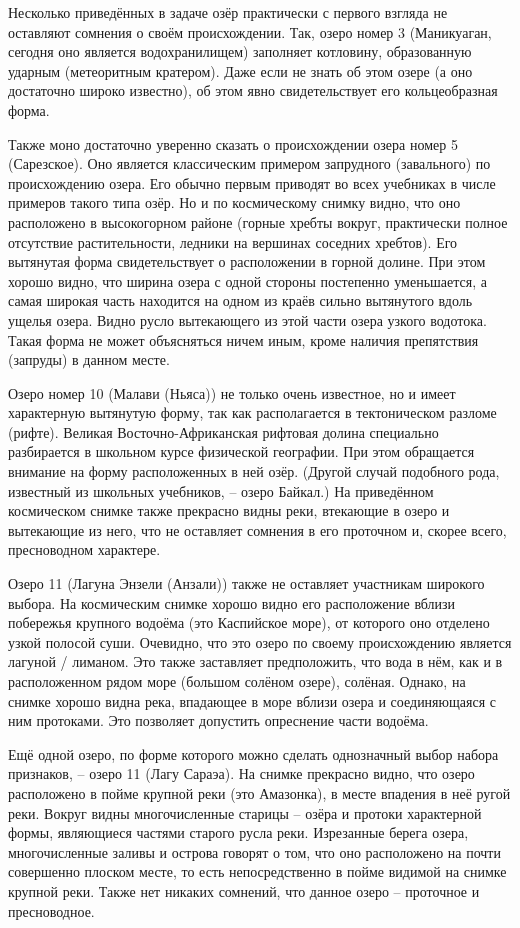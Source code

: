 Несколько приведённых в задаче озёр практически с первого взгляда не оставляют сомнения о своём происхождении. Так, озеро номер 3 (Маникуаган, сегодня оно является водохранилищем) заполняет котловину, образованную ударным (метеоритным кратером). Даже если не знать об этом озере (а оно достаточно широко известно), об этом явно свидетельствует его кольцеобразная форма.

Также моно достаточно уверенно сказать о происхождении озера номер 5 (Сарезское). Оно является классическим примером запрудного (завального) по происхождению озера. Его обычно первым приводят во всех учебниках в числе примеров такого типа озёр. Но и по космическому снимку видно, что оно расположено в высокогорном районе (горные хребты вокруг, практически полное отсутствие растительности, ледники на вершинах соседних хребтов). Его вытянутая форма свидетельствует о расположении в горной долине. При этом хорошо видно, что ширина озера с одной стороны постепенно уменьшается, а самая широкая часть находится на одном из краёв сильно вытянутого вдоль ущелья озера. Видно русло вытекающего из этой части озера узкого водотока. Такая форма не может объясняться ничем иным, кроме наличия препятствия (запруды) в данном месте.

Озеро номер 10 (Малави (Ньяса)) не только очень известное, но и имеет характерную вытянутую форму, так как располагается в тектоническом разломе (рифте). Великая Восточно-Африканская рифтовая долина специально разбирается в школьном курсе физической географии. При этом обращается внимание на форму расположенных в ней озёр. (Другой случай подобного рода, известный из школьных учебников, – озеро Байкал.) На приведённом космическом снимке также прекрасно видны реки, втекающие в озеро и вытекающие из него, что не оставляет сомнения в его проточном и, скорее всего, пресноводном характере.

Озеро 11 (Лагуна Энзели (Анзали)) также не оставляет участникам широкого выбора. На космическим снимке хорошо видно его расположение вблизи побережья крупного водоёма (это Каспийское море), от которого оно отделено узкой полосой суши. Очевидно, что это озеро по своему происхождению является лагуной / лиманом. Это также заставляет предположить, что вода в нём, как и в расположенном рядом море (большом солёном озере), солёная. Однако, на снимке хорошо видна река, впадающее в море вблизи озера и соединяющаяся с ним протоками. Это позволяет допустить опреснение части водоёма.

Ещё одной озеро, по форме которого можно сделать однозначный выбор набора признаков, – озеро 11 (Лагу Сараэа). На снимке прекрасно видно, что озеро расположено в пойме крупной реки (это Амазонка), в месте впадения в неё ругой реки. Вокруг видны многочисленные старицы – озёра и протоки характерной формы, являющиеся частями старого русла реки. Изрезанные берега озера, многочисленные заливы и острова говорят о том, что оно расположено на почти совершенно плоском месте, то есть непосредственно в пойме видимой на снимке крупной реки. Также нет никаких сомнений, что данное озеро – проточное и пресноводное.

